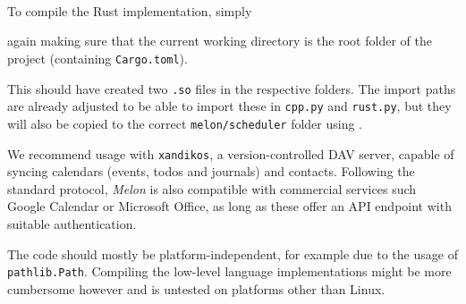 \\
 \\
 \\

To compile the Rust implementation, simply


again making sure that the current working directory is the root folder of the project (containing \texttt{Cargo.toml}).

This should have created two \texttt{.so} files in the respective folders.
The import paths are already adjusted to be able to import these in \texttt{cpp.py} and \texttt{rust.py}, but they will also be copied to the correct \texttt{melon/scheduler} folder using .

We recommend usage with \texttt{xandikos}, a version-controlled DAV server, capable of syncing calendars (events, todos and journals) and contacts.
Following the standard protocol, \textit{Melon} is also compatible with commercial services such Google Calendar or Microsoft Office, as long as these offer an API endpoint with suitable authentication.

The code should mostly be platform-independent, for example due to the usage of \texttt{pathlib.Path}. Compiling the low-level language implementations might be more cumbersome however and is untested on platforms other than Linux.
